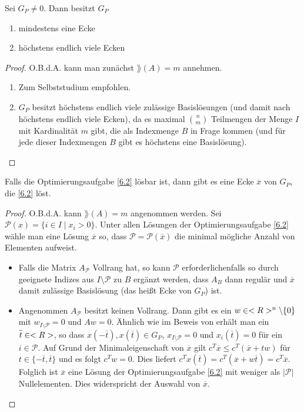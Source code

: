 \begin{proposition}
	Sei $G_P\neq 0$. Dann besitzt $G_P$
	\begin{enumerate}[label=(\alph*)]
		\item mindestens eine Ecke
		\item  höchstens endlich viele Ecken
	\end{enumerate}
\end{proposition}
\begin{proof}
	O.B.d.A. kann man zunächst $\rang(A)=m$ annehmen.
	\begin{enumerate}[label=(\alph*)]
		\item Zum Selbststudium empfohlen.
		\item $G_P$ besitzt höchstens endlich viele zulässige Basislösungen (und damit nach  höchstens endlich viele Ecken), da es maximal $\binom{n}{m}$ Teilmengen der Menge $I$ mit Kardinalität $m$ gibt, die als Indexmenge $B$ in Frage kommen (und für jede dieser Indexmengen $B$ gibt es höchstens eine Basislösung).
	\end{enumerate}
\end{proof}

\begin{proposition}
	Falls die Optimierungsaufgabe \cref{6.2} lösbar ist, dann gibt es eine Ecke $\overline{x}$ von $G_P$, die \cref{6.2} löst.
\end{proposition}
\begin{proof}
	O.B.d.A. kann $\rang(A)=m$ angenommen werden. Sei $\mathcal{P}(x) = \{i\in I\mid x_i>0\}$. Unter allen Lösungen der Optimierungsaufgabe \cref{6.2} wähle man eine Lösung $\overline{x}$ so, dass $\mathcal{P}=\mathcal{P}(\overline{x})$ die minimal mögliche Anzahl von Elementen aufweist. 
	\begin{itemize}
		\item Falls die Matrix $A_\mathcal{P}$ Vollrang hat, so kann $\mathcal{P}$ erforderlichenfalls so durch geeignete Indizes aus $I\setminus\mathcal{P}$ zu $B$ ergänzt werden, dass $A_B$ dann regulär und $\overline{x}$ damit zulässige Basislösung (das heißt Ecke von $G_P$) ist.
		\item Angenommen $A_\mathcal{P}$ besitzt keinen Vollrang. Dann gibt es ein $w\in<R>^n\backslash\{0\}$ mit $w_{I\setminus\mathcal{P}}=0$ und $Aw=0$. Ähnlich wie im Beweis von  erhält man ein $\overline{t}\in\real$, so dass $x(-\overline{t}),x(\overline{t})\in G_P$, $x_{I\setminus\mathcal{P}}=0$ und $x_i(\overline{t})=0$ für ein $i\in\mathcal{P}$. Auf Grund der Minimaleigenschaft von $\overline{x}$ gilt $c^T\overline{x}\le c^T(\overline{x}+tw)$ für $t\in\{-\overline{t},\overline{t}\}$ und es folgt $c^Tw=0$. Dies liefert $c^Tx(\overline{t})=c^T(\overline{x}+w\overline{t})=c^T\overline{x}$. Folglich ist $\overline{x}$ eine Lösung der Optimierungsaufgabe \cref{6.2} mit weniger als $\vert\mathcal{P}\vert$ Nullelementen. Dies widerspricht der Auswahl von $\overline{x}$.
	\end{itemize}
\end{proof}
